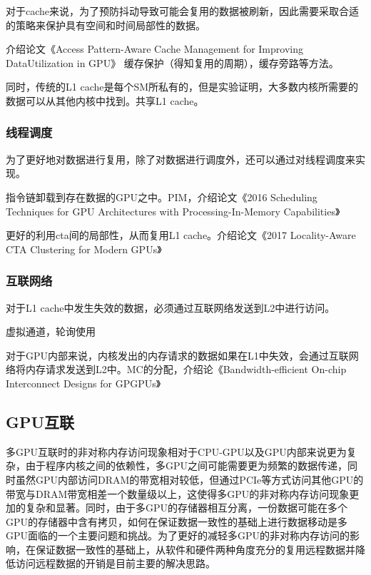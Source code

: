 \documentclass{cjc}
\begin{document}
对于cache来说，为了预防抖动导致可能会复用的数据被刷新，因此需要采取合适的策略来保护具有空间和时间局部性的数据。

介绍论文《Access Pattern-Aware Cache Management for Improving DataUtilization in GPU》
缓存保护（得知复用的周期），缓存旁路等方法。

同时，传统的L1 cache是每个SM所私有的，但是实验证明，大多数内核所需要的数据可以从其他内核中找到。共享L1 cache。

\subsubsection{线程调度}

为了更好地对数据进行复用，除了对数据进行调度外，还可以通过对线程调度来实现。

指令链卸载到存在数据的GPU之中。PIM，介绍论文《2016 Scheduling Techniques for GPU Architectures with Processing-In-Memory Capabilities》

更好的利用cta间的局部性，从而复用L1 cache。介绍论文《2017 Locality-Aware CTA Clustering for Modern GPUs》

\subsubsection{互联网络}

对于L1 cache中发生失效的数据，必须通过互联网络发送到L2中进行访问。

虚拟通道，轮询使用

对于GPU内部来说，内核发出的内存请求的数据如果在L1中失效，会通过互联网络将内存请求发送到L2中。MC的分配，介绍论《Bandwidth-efficient On-chip Interconnect Designs for GPGPUs》


\subsection{GPU互联}

多GPU互联时的非对称内存访问现象相对于CPU-GPU以及GPU内部来说更为复杂，由于程序内核之间的依赖性，多GPU之间可能需要更为频繁的数据传递，同时虽然GPU内部访问DRAM的带宽相对较低，但通过PCIe等方式访问其他GPU的带宽与DRAM带宽相差一个数量级以上，这使得多GPU的非对称内存访问现象更加的复杂和显著。同时，由于多GPU的存储器相互分离，一份数据可能在多个GPU的存储器中含有拷贝，如何在保证数据一致性的基础上进行数据移动是多GPU面临的一个主要问题和挑战。为了更好的减轻多GPU的非对称内存访问的影响，在保证数据一致性的基础上，从软件和硬件两种角度充分的复用远程数据并降低访问远程数据的开销是目前主要的解决思路。
\end{document}
